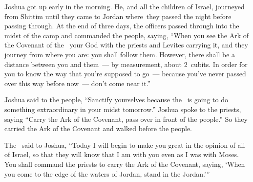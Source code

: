 
\begin{inparaenum}
   Joshua got up early in the morning. He, and all the children of Israel, journeyed from Shittim until they came to Jordan where\understood\ they passed the night before passing through.%
   At the end of three days, the officers passed through into the midst of the camp%
   and commanded the people, saying, ``When you see the Ark of the Covenant of the \lord\ your God with the priests and Levites carrying it, and they journey from where you are: you shall follow them.%
   However, there shall be a distance between you and them~--- by measurement, about 2~cu\-bits. In order for you to know the way that you're supposed to go~--- because you've never passed over this way before now~--- don't come near it.''%
  
   Joshua said to the people, ``Sanctify yourselves because the \lord\ is going to do something extraordinary in your midst tomorrow.''%
   Joshua spoke to the priests, saying ``Carry the Ark of the Covenant, pass over in front of the people.'' So they carried the Ark of the Covenant and walked before the people.%
  
   The \lord\ said to Joshua, ``Today I will begin to make you great in the opinion of all of Israel, so that they will know that I am with you even as I was with Moses.%
   You shall command the priests to carry the Ark of the Covenant, saying, `When you come to the edge of the waters of Jordan, stand in the Jordan.'\thinspace''%
  

\end{inparaenum}
